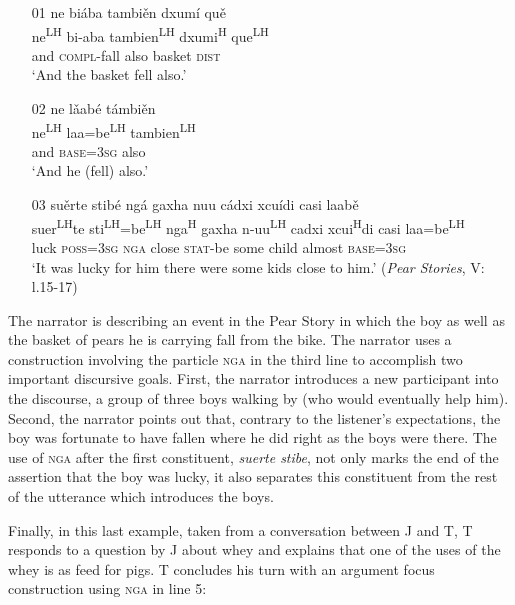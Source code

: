 \ea\label{nga}
\begin{itemize}
\item[01]
\glll ne bi\'{a}ba tambi\v{e}n dxum\'{i} qu\v{e} \\
ne\textsuperscript{LH} bi-aba tambien\textsuperscript{LH} dxumi\textsuperscript{H} que\textsuperscript{LH} \\
and \textsc{compl}-fall also basket \textsc{dist} \\
\glt `And the basket fell also.'


\item[02]
\glll ne l\v{a}ab\'{e} t\'{a}mbi\v{e}n \\
ne\textsuperscript{LH} laa=be\textsuperscript{LH} tambien\textsuperscript{LH} \\
and \textsc{base}=3\textsc{sg} also \\
\glt `And he (fell) also.' 


\item[03]
\glll su\v{e}rte stib\'{e} ng\'{a} gaxha nuu c\'{a}dxi xcu\'{i}di casi laab\v{e}  \\
suer\textsuperscript{LH}te sti\textsuperscript{LH}=be\textsuperscript{LH} nga\textsuperscript{H} gaxha n-uu\textsuperscript{LH} cadxi xcui\textsuperscript{H}di casi laa=be\textsuperscript{LH}  \\
luck \textsc{poss}=3\textsc{sg} \textsc{nga} close \textsc{stat}-be some child almost \textsc{base}=3\textsc{sg}  \\
\glt `It was lucky for him there were some kids close to him.' \hfill (\textit{Pear Stories}, V: l.15-17)

\end{itemize}
\z
The narrator is describing an event in the Pear Story in which the boy as well as the basket of pears he is carrying fall from the bike. The narrator uses a construction involving the particle \textsc{nga} in the third line to accomplish two important discursive goals. First, the narrator introduces a new participant into the discourse, a group of three boys walking by (who would eventually help him). Second, the narrator points out that, contrary to the listener's expectations, the boy was fortunate to have fallen where he did right as the boys were there. The use of \textsc{nga} after the first constituent, \textit{suerte stibe}, not only marks the end of the assertion that the boy was lucky, it also separates this constituent from the rest of the utterance which introduces the boys. 

Finally, in this last example, taken from a conversation between J and T, T responds to a question by J about whey and explains that one of the uses of the whey is as feed for pigs. T concludes his turn with an argument focus construction using \textsc{nga} in line 5:

